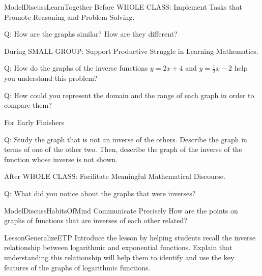 \documentclass{article}
\newenvironment{te-addendum}[2]{}{}     %
\newcommand{\answer}[1]{}               %
\begin{document}
\begin{te-addendum}{ModelDiscuss}{LearnTogether}
Before WHOLE CLASS: Implement Tasks that Promote Reasoning and Problem Solving.

Q: How are the graphs similar? How are they different?
\answer{All three graphs are parabolas with a vertex at $(0,0)$, but they open in different directions.}

During SMALL GROUP: Support Productive Struggle in Learning Mathematics.

Q: How do the graphs of the inverse functions $y=2x+4$ and $y=\frac{1}{2}x-2$ help you understand this problem?
\answer{The graphs of these two inverse linear functions are reflections of each other across the line $y=x$, not across the $x$-axis. The same idea can be applied to determining which parabolas are inverses of each other.}

Q: How could you represent the domain and the range of each graph in order to compare them?
\answer{Write each domain and range as an inequality.}

For Early Finishers

Q: Study the graph that is not an inverse of the others. Describe the graph in terms of one of the other two. Then, describe the graph of the inverse of the function whose inverse is not shown.
\answer{The third graph is a reflection of the first graph across the $x$-axis. The graph of the inverse is a parabola with the vertex at $(0,0)$ that opens to the left.}

After WHOLE CLASS: Facilitate Meaningful Mathematical Discourse.

Q: What did you notice about the graphs that were inverses?
\answer{The graphs that are inverses of each other are reflections across the line $y=x$.}
\end{te-addendum}

\begin{te-addendum}{ModelDiscuss}{HabitsOfMind}
Communicate Precisely How are the points on graphs of functions that are inverses of each other related?
\answer{The $x$-values of a function are the $y$-values of its inverse, and the $y$-values of a function are the $x$-values of its inverse.}
\end{te-addendum}

\begin{te-addendum}{Lesson}{GeneralizeETP}
Introduce the lesson by helping students recall the inverse relationship between logarithmic and exponential functions. Explain that understanding this relationship will help them to identify and use the key features of the graphs of logarithmic functions.
\end{te-addendum}
\end{document}
